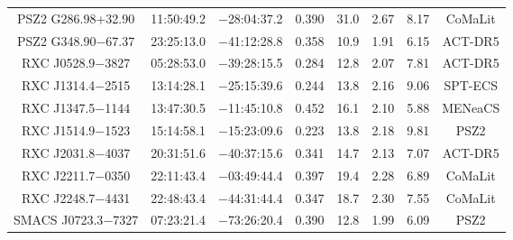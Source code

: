 \begin{table}
\begin{tabular}{cccccccc}
PSZ2 G286.98+32.90 & 11:50:49.2 & $-$28:04:37.2 & 0.390 & 31.0 & 2.67 & 8.17 & CoMaLit \\
PSZ2 G348.90$-$67.37 & 23:25:13.0 & $-$41:12:28.8 & 0.358 & 10.9 & 1.91 & 6.15 & ACT-DR5 \\
RXC J0528.9$-$3827 & 05:28:53.0 & $-$39:28:15.5 & 0.284 & 12.8 & 2.07 & 7.81 & ACT-DR5 \\
RXC J1314.4$-$2515 & 13:14:28.1 & $-$25:15:39.6 & 0.244 & 13.8 & 2.16 & 9.06 & SPT-ECS \\
RXC J1347.5$-$1144 & 13:47:30.5 & $-$11:45:10.8 & 0.452 & 16.1 & 2.10 & 5.88 & MENeaCS \\
RXC J1514.9$-$1523 & 15:14:58.1 & $-$15:23:09.6 & 0.223 & 13.8 & 2.18 & 9.81 & PSZ2 \\
RXC J2031.8$-$4037 & 20:31:51.6 & $-$40:37:15.6 & 0.341 & 14.7 & 2.13 & 7.07 & ACT-DR5 \\
RXC J2211.7$-$0350 & 22:11:43.4 & $-$03:49:44.4 & 0.397 & 19.4 & 2.28 & 6.89 & CoMaLit \\
RXC J2248.7$-$4431 & 22:48:43.4 & $-$44:31:44.4 & 0.347 & 18.7 & 2.30 & 7.55 & CoMaLit \\
SMACS J0723.3$-$7327 & 07:23:21.4 & $-$73:26:20.4 & 0.390 & 12.8 & 1.99 & 6.09 & PSZ2 \\
\end{tabular}
\end{table}
